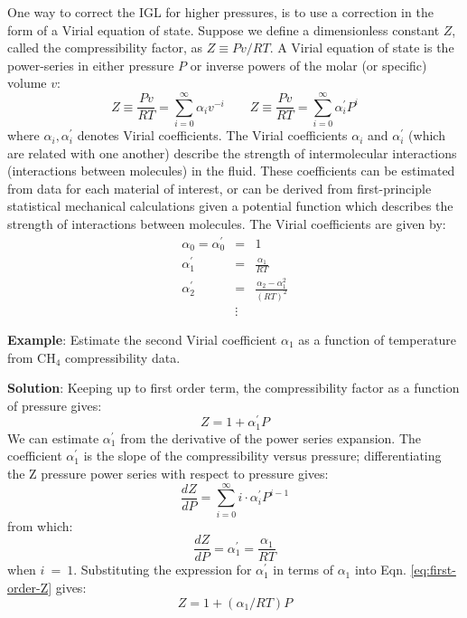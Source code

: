 \documentclass[11pt]{article}
\theoremstyle{definition}
\begin{document}
One way to correct the IGL for higher pressures, is to use a correction in the form of a Virial equation of state.
Suppose we define a dimensionless constant $Z$, called the compressibility factor, as $Z \equiv {Pv}/{RT}$.
A Virial equation of state is the power-series in either pressure $P$ or
inverse powers of the molar (or specific) volume $v$:
\begin{equation}
  \displaystyle Z \equiv \frac{Pv}{RT} = \sum_{i=0}^{\infty}\alpha_{i}v^{-i}\qquad
  \displaystyle Z \equiv \frac{Pv}{RT} = \sum_{i=0}^{\infty}\alpha^{\prime}_{i}P^{i}
\end{equation}
where $\alpha_{i},\alpha^{\prime}_{i}$ denotes Virial coefficients.
The Virial coefficients $\alpha_{i}$ and $\alpha^{\prime}_{i}$ (which are related with one another)
describe the strength of intermolecular interactions (interactions between molecules) in the fluid.
These coefficients can be estimated from data for each material of interest, or can be derived
from first-principle statistical mechanical calculations given a potential function which describes the strength of interactions between molecules.
The Virial coefficients are given by:
\begin{eqnarray*}\nonumber
	\alpha_{0}=\alpha^{\prime}_{0} &=& 1 \\
	\alpha_{1}^{\prime} &=& \frac{\alpha_{1}}{RT}\\\nonumber
  \alpha_{2}^{\prime} &=& \frac{\alpha_{2}-\alpha_{1}^2}{\left(RT\right)^2}\\\nonumber
  & \vdots &
\end{eqnarray*}

\clearpage

\begin{mdframed}[backgroundcolor=lgray]
  \noindent\textbf{Example}: Estimate the second Virial coefficient $\alpha_{1}$ as a function of temperature from CH$_{\mathrm{4}}$ compressibility data.

	\vspace{0.2in}

	\noindent\textbf{Solution}:
	Keeping up to first order term, the compressibility factor as a function of pressure gives:
	\begin{equation}\label{eq:first-order-Z}
		Z = 1 + \alpha^{\prime}_{1}P
	\end{equation}We can estimate $\alpha^{\prime}_{1}$ from the derivative of the power series expansion.
	The coefficient $\alpha^{\prime}_{1}$ is the slope of the compressibility versus pressure;
	differentiating the Z pressure power series with respect to pressure gives:
	\begin{equation}
		\frac{dZ}{dP} = \sum_{i=0}^{\infty}i\cdot\alpha^{\prime}_{i}P^{i-1}
	\end{equation}from which:
	\begin{equation}
		\frac{dZ}{dP} = \alpha^{\prime}_{1} = \frac{\alpha_{1}}{RT}
	\end{equation}when $i~=~1$. Substituting the expression for $\alpha^{\prime}_{1}$ in terms of $\alpha_{1}$ into Eqn. \eqref{eq:first-order-Z} gives:
	\begin{equation}
		Z = 1 + \left(\alpha_{1}/RT\right)P
	\end{equation}
\end{mdframed}
\end{document}
